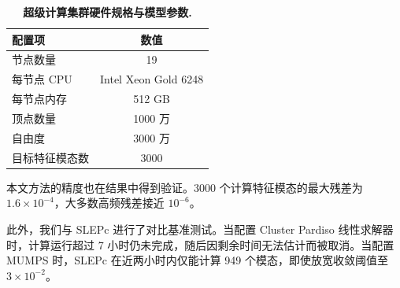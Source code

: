 \begin{table}[H]
  \centering
  \caption{\textbf{超级计算集群硬件规格与模型参数.}}
  \label{tab:statistics}
  \begin{tabular}{l|c}
    \hline
    \textbf{配置项} & \textbf{数值} \\ \hline
    节点数量 & 19 \\
    每节点 CPU & Intel Xeon Gold 6248 \\
    每节点内存 & 512 GB \\
    顶点数量 & 1000 万 \\
    自由度 & 3000 万 \\
    目标特征模态数 & 3000 \\
    \hline
  \end{tabular}
\end{table}

本文方法的精度也在结果中得到验证。3000 个计算特征模态的最大残差为 $1.6 \times 10^{-4}$，大多数高频残差接近 $10^{-6}$。

此外，我们与 SLEPc 进行了对比基准测试。当配置 Cluster Pardiso 线性求解器时，计算运行超过 7 小时仍未完成，随后因剩余时间无法估计而被取消。当配置 MUMPS 时，SLEPc 在近两小时内仅能计算 949 个模态，即使放宽收敛阈值至 $3 \times 10^{-2}$。